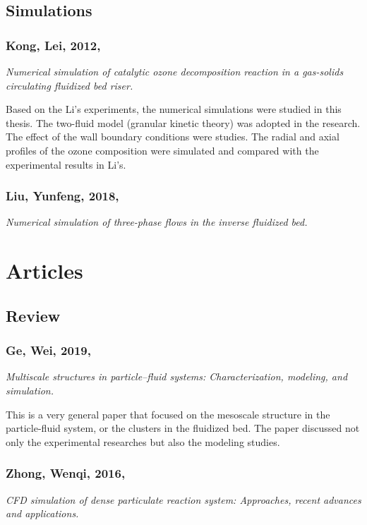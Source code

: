 \documentclass[12pt]{report}
\begin{document}
\section{Simulations}
%
%
\subsection{Kong, Lei, 2012, \cite{konglei2012}}
\textit{Numerical simulation of catalytic ozone decomposition reaction in a gas-solids circulating fluidized bed riser.}

Based on the Li's experiments, the numerical simulations were studied in this thesis. The two-fluid model (granular kinetic theory) was adopted in the research. The effect of the wall boundary conditions were studies. The radial and axial profiles of the ozone composition were simulated and compared with the experimental results in Li's.

%
%
\subsection{Liu, Yunfeng, 2018, \cite{liuyf2018}}
\textit{Numerical simulation of three-phase flows in the inverse fluidized bed.}

\chapter{Articles}
\section{Review}
%
%
\subsection{Ge, Wei, 2019, \cite{ge2019multiscale}}
\textit{Multiscale structures in particle--fluid systems: Characterization, modeling, and simulation.}

This is a very general paper that focused on the mesoscale structure in the particle-fluid system, or the clusters in the fluidized bed. The paper discussed not only the experimental researches but also the modeling studies. 
%
%
\subsection{Zhong, Wenqi, 2016, \cite{zhong2016cfd}}
\textit{CFD simulation of dense particulate reaction system: Approaches, recent advances and applications.}
\end{document}
